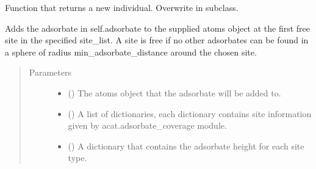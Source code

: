 \documentclass[letterpaper,10pt,english]{sphinxmanual}
\begin{document}
\begin{fulllineitems}
\begin{fulllineitems}
\label{\detokenize{ga:acat.ga.adsorbate_operators.AdsorbateOperator.get_new_individual}}
Function that returns a new individual.
Overwrite in subclass.

\end{fulllineitems}


\begin{fulllineitems}
\label{\detokenize{ga:acat.ga.adsorbate_operators.AdsorbateOperator.add_adsorbate}}
Adds the adsorbate in self.adsorbate to the supplied atoms
object at the first free site in the specified site\_list. A site
is free if no other adsorbates can be found in a sphere of radius
min\_adsorbate\_distance around the chosen site.
\begin{quote}\begin{description}
\item[{Parameters}] \leavevmode\begin{itemize}
\item {} 
 () \textendash{} The atoms object that the adsorbate will be added to.

\item {} 
 () \textendash{} A list of dictionaries, each dictionary contains site
information given by acat.adsorbate\_coverage module.

\item {} 
 () \textendash{} A dictionary that contains the adsorbate height for each site
type.


\end{itemize}
\end{description}
\end{quote}
\end{fulllineitems}
\end{fulllineitems}
\end{document}
